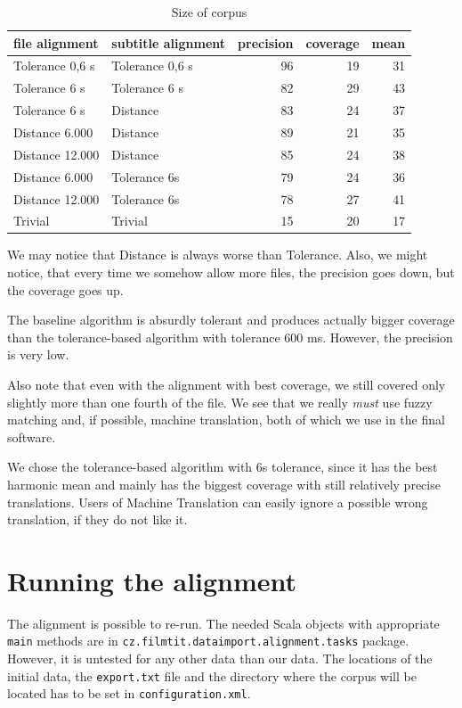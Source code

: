 \begin{table}[h]
\begin{center}
\begin{tabular}{|l|l|r|r|r|}
    \hline
    \textbf{file alignment} & \textbf{subtitle alignment} & \textbf{precision} & \textbf{coverage} & \textbf{mean} \\ \hline
    Tolerance 0,6 s & Tolerance 0,6 s & 96  & 19  & 31 \\ \hline
    Tolerance 6 s & Tolerance 6 s & 82  & 29 & 43 \\ \hline
    Tolerance 6 s & Distance & 83 & 24 & 37 \\ \hline
    Distance 6.000 & Distance &  89 & 21 & 35 \\ \hline
    Distance 12.000 & Distance & 85 & 24 & 38 \\ \hline
    Distance 6.000 & Tolerance 6s & 79 & 24 & 36 \\ \hline
    Distance 12.000 & Tolerance 6s & 78 & 27 & 41 \\ \hline
    Trivial & Trivial & 15 & 20 & 17 \\ \hline
    
\end{tabular}
\end{center}

\caption{Size of corpus}\label{tm_simulation}
\end{table}

We may notice that Distance is always worse than Tolerance. Also, we might notice, that every time we somehow allow more files, the precision goes down, but the coverage goes up.

The baseline algorithm is absurdly tolerant and produces actually bigger coverage than the tolerance-based algorithm with tolerance 600 ms. However, the precision is very low.

Also note that even with the alignment with best coverage, we still covered only slightly more than one fourth of the file. We see that we really \emph{must} use fuzzy matching and, if possible, machine translation, both of which we use in the final software.

We chose the tolerance-based algorithm with 6s tolerance, since it has the best harmonic mean and mainly has the biggest coverage with still relatively precise translations. Users of Machine Translation can easily ignore a possible wrong translation, if they do not like it.

\section{Running the alignment}
The alignment is possible to re-run. The needed Scala objects with appropriate \texttt{main} methods are in \texttt{cz.filmtit.dataimport.alignment.tasks} package. However, it is untested for any other data than our data. The locations of the initial data, the \texttt{export.txt} file and the directory where the corpus will be located has to be set in \texttt{configuration.xml}.

